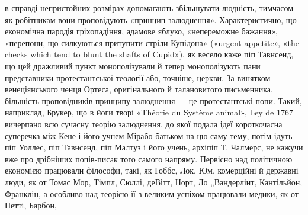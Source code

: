 в справді непристойних розмірах допомагають збільшувати людність,
тимчасом як робітникам вони проповідують «принцип залюднення».
Характеристично, що економічна пародія гріхопадіння, адамове яблуко,
«непереможне бажання», «перепони, що силкуються притупити стріли
Купідона» («urgent appetite», «the checks which tend to blunt the shafts
of Cupid»), як весело каже піп Тавнсенд, що цей дражливий пункт монополізували
й тепер монополізують пани представники протестантської
теології або, точніше, церкви. За винятком венеціянського ченця Ортеса,
оригінального й талановитого письменника, більшість проповідників
принципу залюднення — це протестантські попи. Такий, наприклад,
Брукер, що в йоги творі «Théorie du Système animal», Ley de 1767 вичерпано
всю сучасну теорію залюднення, до якої подала ідеї короткочасна
суперечка між Кене і його учнем Мірабо-батьком на цю саму тему,
потім ідуть піп Уоллес, піп Тавнсенд, піп Малтуз і його учень, архіпіп
Т. Чалмерс, не кажучи вже про дрібніших попів-писак того самого напряму.
Первісно над політичною економією працювали філософи, такі,
як Гоббс, Лок, Юм, комерційні й державні люди, як от Томас Мор, Тімпл,
Сюллі, деВітт, Норт, Ло „Вандерлінт, Кантільйон, Франклін, а особливо
над теорією її з великим успіхом працювали медики, як от Петті, Барбон,
